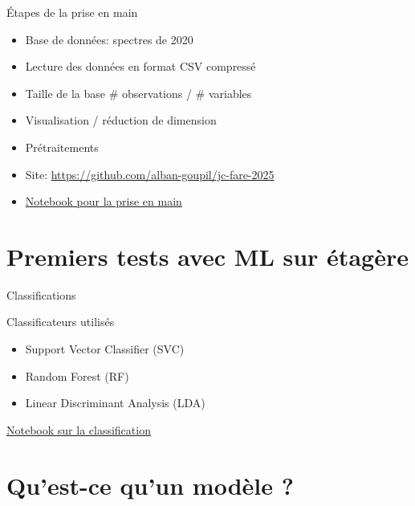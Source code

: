\documentclass[presentation, aspectratio=169]{beamer}
\begin{document}
\begin{frame}{Étapes de la prise en main}
  \begin{itemize}
  \item Base de données: spectres de 2020
  \item Lecture des données en format CSV compressé
  \item Taille de la base \# observations / \# variables
  \item Visualisation / réduction de dimension
  \item Prétraitements
  \end{itemize}

  \begin{itemize}
  \item Site: \url{https://github.com/alban-goupil/jc-fare-2025}
  \item \href{https://github.com/alban-goupil/jc-fare-2025/blob/main/notebooks/1-prise-en-main.ipynb}{Notebook
      pour la prise en main}
  \end{itemize}
\end{frame}


\section{Premiers tests avec ML sur étagère}

\begin{frame}{Classifications}
  \begin{block}{Classificateurs utilisés}
    \begin{itemize}
    \item Support Vector Classifier (SVC)
    \item Random Forest (RF)
    \item Linear Discriminant Analysis (LDA)
    \end{itemize}
  \end{block}

  \href{https://github.com/alban-goupil/jc-fare-2025/blob/main/notebooks/2-classifieurs.ipynb}{Notebook
    sur la classification}
\end{frame}


\section{Qu'est-ce qu'un modèle ?}
\end{document}
